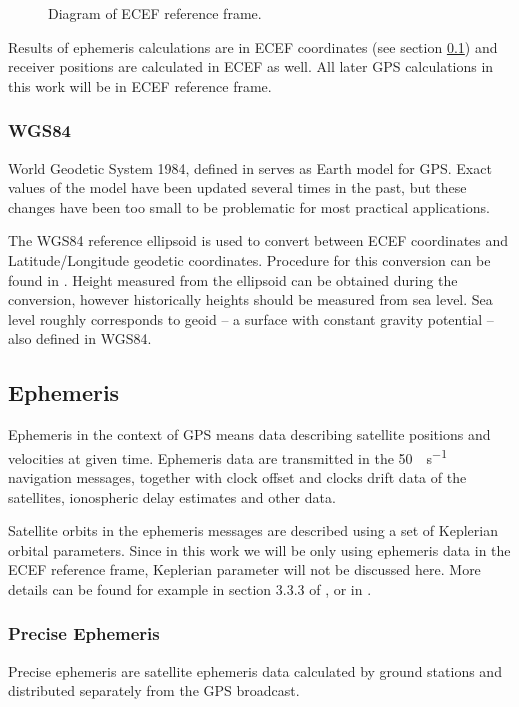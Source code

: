 \begin{figure}[h]
	\centering
	
	\caption{Diagram of ECEF reference frame.}
	\label{fig:ecef}
\end{figure}

Results of ephemeris calculations are in ECEF coordinates
(see section \ref{sec:gps-ephemeris}) and receiver positions are calculated
in ECEF as well.
All later GPS calculations in this work will be in ECEF reference frame.

\subsubsection{WGS84}
World Geodetic System 1984, defined in \cite{nima04}
serves as Earth model for GPS.
Exact values of the model have been updated several times in the past,
but these changes have been too small to be problematic for most practical
applications.

The WGS84 reference ellipsoid is used to convert between ECEF coordinates and
Latitude/Longitude geodetic coordinates.
Procedure for this conversion can be found in \cite{nima04}.
Height measured from the ellipsoid can be obtained during the conversion,
however historically heights should be measured from sea level.
Sea level roughly corresponds to geoid -- a surface with constant gravity
potential -- also defined in WGS84.



\subsection{Ephemeris}
\label{sec:gps-ephemeris}

Ephemeris in the context of GPS means data describing satellite positions and velocities
at given time.
Ephemeris data are transmitted in the \SI{50}{\bit\per\second} navigation messages,
together with clock offset and clocks drift data of the satellites, ionospheric
delay estimates and other data.

Satellite orbits in the ephemeris messages are described using a set of Keplerian orbital parameters.
Since in this work we will be only using ephemeris data in the ECEF reference frame, Keplerian parameter
will not be discussed here.
More details can be found for example in section 3.3.3 of \cite{rizos99}, or in \cite{kaplan06}.

\subsubsection{Precise Ephemeris}
Precise ephemeris are satellite ephemeris data calculated by ground stations
and distributed separately from the GPS broadcast.


